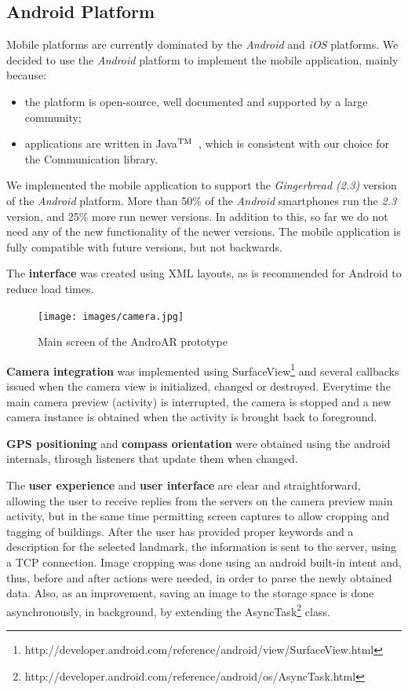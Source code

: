 \documentclass[a4paper,onecolumn,oneside,titlepage,11pt]{report}
\def\tm{\leavevmode\hbox{$\rm {}^{TM}$}}
\begin{document}
\subsection{Android Platform}
Mobile platforms are currently dominated by the \emph{Android} and \emph{iOS} platforms. We decided to use the \emph{Android} platform to implement the mobile application, mainly because:
\begin{itemize}
	\item the platform is open-source, well documented and supported by a large community;
	\item applications are written in Java\tm\ , which is consistent with our choice for the Communication library.
\end{itemize}
We implemented the mobile application to support the \emph{Gingerbread (2.3)} version of the \emph{Android} platform. More than 50\% of the \emph{Android} smartphones run the \emph{2.3} version, and 25\% more run newer versions. In addition to this, so far we do not need any of the new functionality of the newer versions. The mobile application is fully compatible with future versions, but not backwards.

The \textbf{interface} was created using XML layouts, as is recommended for Android to reduce load times.

\begin{figure}[H]
\begin{center}
\texttt{[image: images/camera.jpg]}
\caption{Main screen of the AndroAR prototype}
\end{center}
\end{figure}

\textbf{Camera integration} was implemented using SurfaceView\footnote{http://developer.android.com/reference/android/view/SurfaceView.html} and several callbacks issued when the camera view is initialized, changed or destroyed. Everytime the main camera preview (activity) is interrupted, the camera is stopped and a new camera instance is obtained when the activity is brought back to foreground.

\textbf{GPS positioning} and \textbf{compass orientation} were obtained using the android internals,
through listeners that update them when changed.

The \textbf{user experience} and \textbf{user interface} are clear and straightforward, allowing the user to receive replies from the servers on the camera preview main activity, but in the same time permitting screen captures to allow cropping and tagging of buildings. After the user has provided proper keywords and a description for the selected landmark, the information is sent to the server, using a TCP connection.
Image cropping was done using an android built-in intent and, thus, before and after actions were needed, in order to parse the newly obtained data. Also, as an improvement, saving an image to the storage space is done asynchronously, in background, by extending the AsyncTask\footnote{http://developer.android.com/reference/android/os/AsyncTask.html} class.
\end{document}
